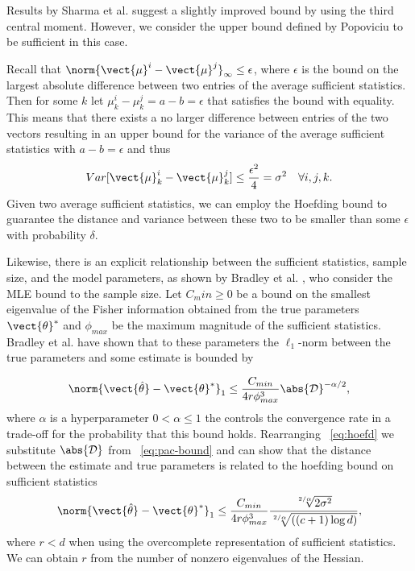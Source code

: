 Results by Sharma et al. \cite{sharma2010betterbounds} suggest a slightly improved bound by using the third central moment.
However, we consider the upper bound defined by Popoviciu to be sufficient in this case.



Recall that $\norm{\vect{\mu}^{i} -  \vect{\mu}^{j}}_\infty \leq  \epsilon$, where $\epsilon$ is the bound on the largest absolute difference between two entries of the average sufficient statistics. 
Then for some $k$ let  $\mu^{i}_k - \mu^{j}_k = a - b  = \epsilon$ that satisfies the bound with equality.
This means that there exists a no larger difference between entries of the two vectors resulting in an upper bound for the variance of the average sufficient statistics with $a - b = \epsilon$ and thus
\begin{equation*}
    Var[\vect{\mu}^{i}_k -  \vect{\mu}^{j}_k] \leq \frac{\epsilon^2}{4} = \sigma^2 \quad \forall i,j,k.
\end{equation*}
Given two average sufficient statistics, we can employ the Hoefding bound to guarantee the distance and variance between these two to be smaller than some $\epsilon$ with probability $\delta$.

Likewise, there is an explicit relationship between the sufficient statistics, sample size, and the model parameters, as shown by Bradley et al. \cite{bradley2012sample}, who consider the MLE bound \wrt to the sample size. 
Let $C_min \geq 0$ be a bound on the smallest eigenvalue of the Fisher information obtained from the true parameters $\vect{\theta}^*$ and $\phi_{max}$ be the maximum magnitude of the sufficient statistics. 
Bradley et al. have shown that \wrt to these parameters the $\ell_1$-norm between the true parameters and some estimate is bounded by 

\begin{equation}
    \label{eq:pac-bound}
    \norm{\vect{\hat{\theta}}- \vect{\theta}^*}_1 \leq \frac{C_{min}}{4r\phi^3_{max}} \abs{\mathcal{D}}^{-\alpha/2},
\end{equation}
where $\alpha$ is a hyperparameter $0 < \alpha \leq 1$ the controls the convergence rate in a trade-off for the probability that this bound holds. 
Rearranging \eq~\ref{eq:hoefd} we substitute $\abs{\mathcal{D}}$ from \eq~\ref{eq:pac-bound} and can show that the distance between the estimate and true parameters is related to the hoefding bound on sufficient statistics
\begin{equation}
    \norm{\vect{\hat{\theta}}- \vect{\theta}^*}_1 \leq \frac{C_{min}}{4r\phi^3_{max}} \frac{\sqrt[2/\alpha]{2\sigma^2}}{\sqrt[2/\alpha]{((c+1) \log d)}},
\end{equation}
where $r < d$ when using the overcomplete representation of sufficient statistics.
We can obtain $r$ from the number of nonzero eigenvalues of the Hessian.

